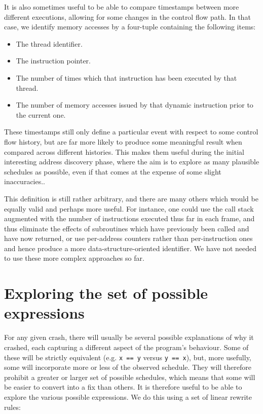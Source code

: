 \documentclass[10pt,a4paper,twocolumn]{article}
\begin{document}
It is also sometimes useful to be able to compare timestamps between
more different executions, allowing for some changes in the control
flow path.  In that case, we identify memory accesses by a four-tuple
containing the following items:

\begin{itemize}
\item The thread identifier.
\item The instruction pointer.
\item The number of times which that instruction has been executed by
  that thread.
\item The number of memory accesses issued by that dynamic instruction
  prior to the current one.
\end{itemize}

These timestamps still only define a particular event with respect to
some control flow history, but are far more likely to produce some
meaningful result when compared across different histories.  This
makes them useful during the initial interesting address discovery
phase, where the aim is to explore as many plausible schedules as
possible, even if that comes at the expense of some slight
inaccuracies..

This definition is still rather arbitrary, and there are many others
which would be equally valid and perhaps more useful.  For instance,
one could use the call stack augmented with the number of instructions
executed thus far in each frame, and thus eliminate the effects of
subroutines which have previously been called and have now returned,
or use per-address counters rather than per-instruction ones and hence
produce a more data-structure-oriented identifier.  We have not needed
to use these more complex approaches so far.

\section{Exploring the set of possible expressions}

For any given crash, there will usually be several possible
explanations of why it crashed, each capturing a different aspect of
the program's behaviour.  Some of these will be strictly equivalent
(e.g. \verb|x == y| versus \verb|y == x|), but, more usefully, some
will incorporate more or less of the observed schedule.  They will
therefore prohibit a greater or larger set of possible schedules,
which means that some will be easier to convert into a fix than
others.  It is therefore useful to be able to explore the various
possible expressions.  We do this using a set of linear rewrite
rules:
\end{document}
